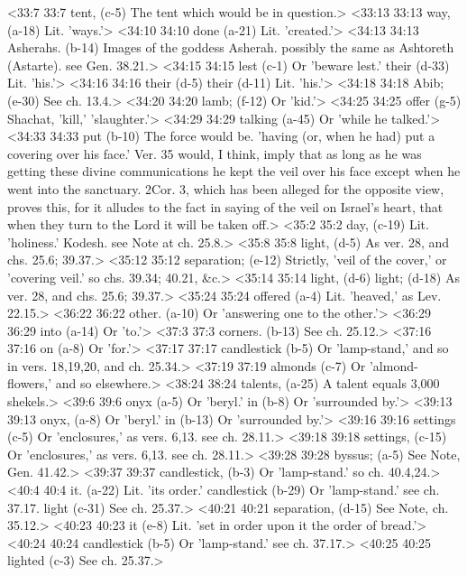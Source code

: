 <33:7 33:7  tent, (c-5)  The tent which would be in question.>
<33:13 33:13  way, (a-18)  Lit. 'ways.'>
<34:10 34:10  done (a-21)  Lit. 'created.'>
<34:13 34:13  Asherahs. (b-14)  Images of the goddess Asherah. possibly the same as Ashtoreth  (Astarte). see Gen. 38.21.>
<34:15 34:15  lest (c-1)  Or 'beware lest.'
  their (d-33) Lit. 'his.'>
<34:16 34:16  their (d-5)  their (d-11)
  Lit. 'his.'>
<34:18 34:18  Abib; (e-30)  See ch. 13.4.>
<34:20 34:20  lamb; (f-12)  Or 'kid.'>
<34:25 34:25  offer (g-5)  Shachat, 'kill,' 'slaughter.'>
<34:29 34:29  talking (a-45)  Or 'while he talked.'>
<34:33 34:33  put (b-10)  The force would be. 'having (or, when he had) put a covering  over his face.' Ver. 35 would, I think, imply that as long as  he was getting these divine communications he kept the veil  over his face except when he went into the sanctuary. 2Cor. 3,  which has been alleged for the opposite view, proves this, for  it alludes to the fact in saying of the veil on Israel's heart,  that when they turn to the Lord it will be taken off.>
<35:2 35:2  day, (c-19)  Lit. 'holiness.' Kodesh. see Note at ch. 25.8.>
<35:8 35:8  light, (d-5) As ver. 28, and chs. 25.6; 39.37.>
<35:12 35:12  separation; (e-12)  Strictly, 'veil of the cover,' or 'covering veil.' so chs.  39.34; 40.21, &c.>
<35:14 35:14  light, (d-6)  light; (d-18)
  As ver. 28, and chs. 25.6; 39.37.>
<35:24 35:24  offered (a-4)  Lit. 'heaved,' as Lev. 22.15.>
<36:22 36:22  other. (a-10)  Or 'answering one to the other.'>
<36:29 36:29  into (a-14)  Or 'to.'>
<37:3 37:3  corners. (b-13)  See ch. 25.12.>
<37:16 37:16  on (a-8)  Or 'for.'>
<37:17 37:17  candlestick (b-5)  Or 'lamp-stand,' and so in vers. 18,19,20, and ch. 25.34.>
<37:19 37:19  almonds (c-7)  Or 'almond-flowers,' and so elsewhere.>
<38:24 38:24  talents, (a-25)  A talent equals 3,000 shekels.>
<39:6 39:6  onyx (a-5) Or 'beryl.'
  in (b-8) Or 'surrounded by.'>
<39:13 39:13  onyx, (a-8)  Or 'beryl.'
  in (b-13)  Or 'surrounded by.'>
<39:16 39:16  settings (c-5) Or 'enclosures,' as vers. 6,13. see ch. 28.11.>
<39:18 39:18  settings, (c-15)  Or 'enclosures,' as vers. 6,13. see ch. 28.11.>
<39:28 39:28  byssus; (a-5)  See Note, Gen. 41.42.>
<39:37 39:37  candlestick, (b-3)  Or 'lamp-stand.' so ch. 40.4,24.>
<40:4 40:4  it. (a-22)  Lit. 'its order.'
  candlestick (b-29) Or 'lamp-stand.' see ch. 37.17.
  light (c-31) See ch. 25.37.>
<40:21 40:21  separation, (d-15)  See Note, ch. 35.12.>
<40:23 40:23  it (e-8)  Lit. 'set in order upon it the order of bread.'>
<40:24 40:24  candlestick (b-5)  Or 'lamp-stand.' see ch. 37.17.>
<40:25 40:25  lighted (c-3)  See ch. 25.37.>
